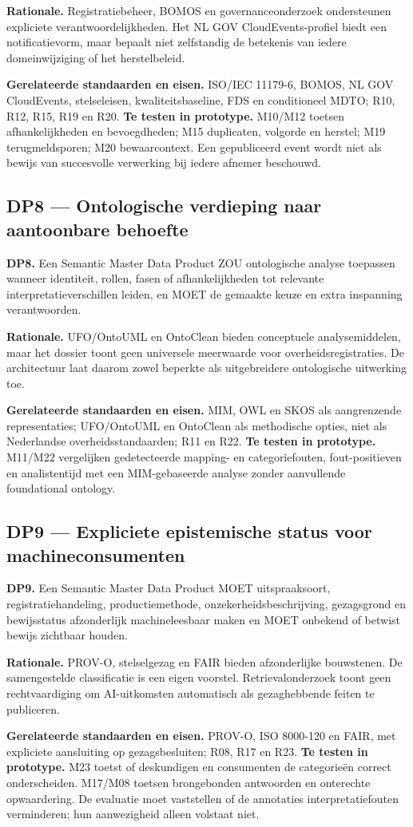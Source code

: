 \textbf{Rationale.} Registratiebeheer, BOMOS en governance\-onderzoek ondersteunen expliciete verantwoordelijkheden. \citep{S10,S23,L07,L17} Het NL GOV CloudEvents-profiel biedt een notificatievorm, maar bepaalt niet zelfstandig de betekenis van iedere domeinwijziging of het herstelbeleid. \citep{S22}

\textbf{Gerelateerde standaarden en eisen.} ISO/IEC 11179-6, BOMOS, NL GOV CloudEvents, stelseleisen, kwaliteitsbaseline, FDS en conditioneel MDTO; R10, R12, R15, R19 en R20. \textbf{Te testen in prototype.} M10/M12 toetsen afhankelijkheden en bevoegdheden; M15 duplicaten, volgorde en herstel; M19 terugmeldsporen; M20 bewaarcontext. Een gepubliceerd event wordt niet als bewijs van succesvolle verwerking bij iedere afnemer beschouwd.

\subsection*{DP8 --- Ontologische verdieping naar aantoonbare behoefte}
\textbf{DP8.} Een Semantic Master Data Product ZOU ontologische analyse toepassen wanneer identiteit, rollen, fasen of afhankelijkheden tot relevante interpretatieverschillen leiden, en MOET de gemaakte keuze en extra inspanning verantwoorden.

\textbf{Rationale.} UFO/OntoUML en OntoClean bieden conceptuele analysemiddelen, maar het dossier toont geen universele meerwaarde voor overheidsregistraties. \citep{L08,L09,L10,S40,S41} De architectuur laat daarom zowel beperkte als uitgebreidere ontologische uitwerking toe.

\textbf{Gerelateerde standaarden en eisen.} MIM, OWL en SKOS als aangrenzende representaties; UFO/OntoUML en OntoClean als methodische opties, niet als Nederlandse overheidsstandaarden; R11 en R22. \textbf{Te testen in prototype.} M11/M22 vergelijken gedetecteerde mapping- en categoriefouten, fout-positieven en analistentijd met een MIM-gebaseerde analyse zonder aanvullende foundational ontology.

\subsection*{DP9 --- Expliciete epistemische status voor machineconsumenten}
\textbf{DP9.} Een Semantic Master Data Product MOET uitspraaksoort, registratiehandeling, productiemethode, onzekerheidsbeschrijving, gezagsgrond en bewijsstatus afzonderlijk machineleesbaar maken en MOET onbekend of betwist bewijs zichtbaar houden.

\textbf{Rationale.} PROV-O, stelselgezag en FAIR bieden afzonderlijke bouwstenen. \citep{S33,S25,L11} De samengestelde classificatie is een eigen voorstel. Retrievalonderzoek toont geen rechtvaardiging om AI-uitkomsten automatisch als gezaghebbende feiten te publiceren. \citep{L16}

\textbf{Gerelateerde standaarden en eisen.} PROV-O, ISO 8000-120 en FAIR, met expliciete aansluiting op gezagsbesluiten; R08, R17 en R23. \textbf{Te testen in prototype.} M23 toetst of deskundigen en consumenten de categorieën correct onderscheiden. M17/M08 toetsen brongebonden antwoorden en onterechte opwaardering. De evaluatie moet vaststellen of de annotaties interpretatiefouten verminderen; hun aanwezigheid alleen volstaat niet.
